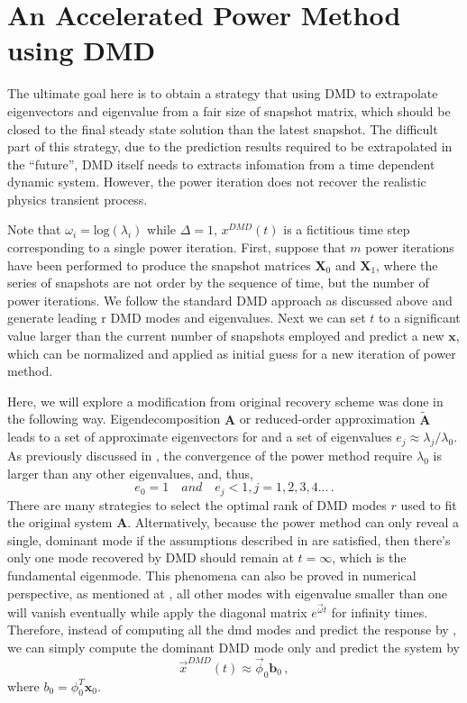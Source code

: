 \section{An Accelerated Power Method using DMD}
\label{sec:dmdpi}
The ultimate goal here is to obtain a strategy that using DMD to extrapolate eigenvectors and eigenvalue from a fair size of snapshot matrix, which should be closed to the final steady state solution than the latest snapshot.
The difficult part of this strategy, due to the prediction results required to be extrapolated in the ``future'', DMD itself needs to extracts infomation from a time dependent dynamic system.
However, the power iteration does not recover the realistic physics transient process. 

Note that $\omega_i= \text{log}(\lambda_i)$ while $\Delta = 1$, $x^{DMD}(t)$ is a fictitious time step corresponding to a single power iteration.
First, suppose that $m$ power iterations have been performed to produce the snapshot matrices $\mathbf{X}_0$ and $\mathbf{X}_1$, where the series of snapshots are not order by the sequence of time, but the number of power iterations.
We follow the standard DMD approach as discussed above and generate leading r DMD modes and eigenvalues.
Next we can set $t$ to a significant value larger than the current number of snapshots employed and predict a new $\mathbf{x}$, which can be normalized and applied as initial guess for a new iteration of power method.

Here, we will explore a modification from original recovery scheme was done in the following way.
Eigendecomposition $\mathbf{A}$ or reduced-order approximation $\mathbf{\tilde{A}}$ leads to a set of approximate eigenvectors for  and a set of eigenvalues $e_j \approx \lambda_j / \lambda_0$.
As previously discussed in , the convergence of the power method require $\lambda_0$ is larger than any other eigenvalues, and, thus, 
\begin{equation}
\label{eq:ej}
e_0 = 1 \quad and  \quad e_j < 1,j = 1,2,3,4... \, .
\end{equation}
There are many strategies to select the optimal rank of DMD modes $r$ used to fit the original system $\mathbf{A}$. 
Alternatively, because the power method can only reveal a single, dominant mode if the assumptions described in  are satisfied, then there's only one mode recovered by DMD should remain at $t=\infty$, which is the fundamental eigenmode.
This phenomena can also be proved in numerical perspective, as mentioned at , all other modes with eigenvalue smaller than one will vanish eventually while apply the diagonal matrix $e^{\vec{\omega}t}$ for infinity times.
Therefore, instead of computing all the dmd modes and predict the response by , we can simply compute the dominant DMD mode only and predict the system by 
\begin{equation}
\label{eq:f_mode}
\vec{x}^{DMD}(t) \approx \vec{\phi}_0 \mathbf{b}_0 \, ,
\end{equation}
where $b_0= \phi^{T}_0 \mathbf{x}_{0}$.

